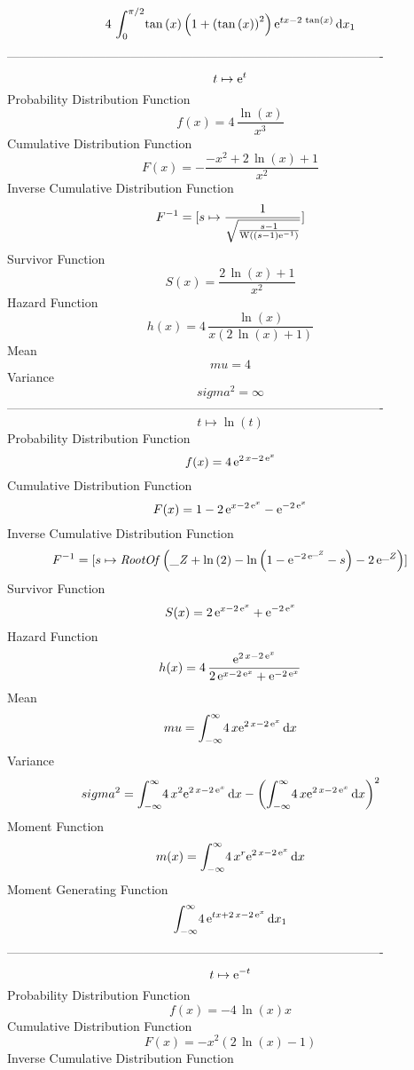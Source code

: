 \documentclass[12pt]{article}
\begin{document}
 $$4\,\int_{0}^{\pi/2}\!\tan \left( x \right)  \left( 1+ \left( \tan
 \left( x \right)  \right) ^{2} \right) {{\rm e}^{tx-2\,\tan \left( x
 \right) }}\,{\rm d}x_{{1}}
$$-------------------------------------------------------------------------------------------  \\$$t\mapsto {{\rm e}^{t}}
$$Probability Distribution Function 
$$  f(x)=4\,{\frac {\ln  \left( x \right) }{{x}^{3}}}
$$Cumulative Distribution Function  
 $$F(x)=-{\frac {-{x}^{2}+2\,\ln  \left( x \right) +1}{{x}^{2}}}
$$ Inverse Cumulative Distribution Function 
  $$F^{-1} = [s\mapsto {\frac {1}{\sqrt {{\frac {s-1}{{\rm W} \left( \left( s-1
 \right) {{\rm e}^{-1}}\right)}}}}}]
$$Survivor Function 
 $$ S(x)={\frac {2\,\ln  \left( x \right) +1}{{x}^{2}}}
$$ Hazard Function 
 $$ h(x)=4\,{\frac {\ln  \left( x \right) }{x \left( 2\,\ln  \left( x \right) +
1 \right) }}
$$Mean 
 $$ mu=4
$$ Variance 
 $$ sigma^2 = \infty $$
-------------------------------------------------------------------------------------------  \\$$t\mapsto \ln  \left( t \right) 
$$Probability Distribution Function 
$$  f(x)=4\,{{\rm e}^{2\,x-2\,{{\rm e}^{x}}}}
$$Cumulative Distribution Function  
 $$F(x)=1-2\,{{\rm e}^{x-2\,{{\rm e}^{x}}}}-{{\rm e}^{-2\,{{\rm e}^{x}}}}
$$ Inverse Cumulative Distribution Function 
  $$F^{-1} = [s\mapsto {\it RootOf} \left( {\it \_Z}+\ln  \left( 2 \right) -\ln 
 \left( 1-{{\rm e}^{-2\,{{\rm e}^{{\it \_Z}}}}}-s \right) -2\,{{\rm e}
^{{\it \_Z}}} \right) ]
$$Survivor Function 
 $$ S(x)=2\,{{\rm e}^{x-2\,{{\rm e}^{x}}}}+{{\rm e}^{-2\,{{\rm e}^{x}}}}
$$ Hazard Function 
 $$ h(x)=4\,{\frac {{{\rm e}^{2\,x-2\,{{\rm e}^{x}}}}}{2\,{{\rm e}^{x-2\,{
{\rm e}^{x}}}}+{{\rm e}^{-2\,{{\rm e}^{x}}}}}}
$$Mean 
 $$ mu=\int_{-\infty }^{\infty }\!4\,x{{\rm e}^{2\,x-2\,{{\rm e}^{x}}}}
\,{\rm d}x
$$ Variance 
 $$ sigma^2 = \int_{-\infty }^{\infty }\!4\,{x}^{2}{{\rm e}^{2\,x-2\,{{\rm e}^{x}}}}
\,{\rm d}x- \left( \int_{-\infty }^{\infty }\!4\,x{{\rm e}^{2\,x-2\,{
{\rm e}^{x}}}}\,{\rm d}x \right) ^{2}
$$Moment Function 
 $$ m(x) = \int_{-\infty }^{\infty }\!4\,{x}^{r}{{\rm e}^{2\,x-2\,{{\rm e}^{x}}}}
\,{\rm d}x
$$ Moment Generating Function 
 $$\int_{-\infty }^{\infty }\!4\,{{\rm e}^{tx+2\,x-2\,{{\rm e}^{x}}}}
\,{\rm d}x_{{1}}
$$-------------------------------------------------------------------------------------------  \\$$t\mapsto {{\rm e}^{-t}}
$$Probability Distribution Function 
$$  f(x)=-4\,\ln  \left( x \right) x
$$Cumulative Distribution Function  
 $$F(x)=-{x}^{2} \left( 2\,\ln  \left( x \right) -1 \right) 
$$ Inverse Cumulative Distribution Function 
\end{document}
